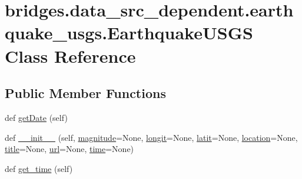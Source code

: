 \hypertarget{classbridges_1_1data__src__dependent_1_1earthquake__usgs_1_1_earthquake_u_s_g_s}{}\section{bridges.\+data\+\_\+src\+\_\+dependent.\+earthquake\+\_\+usgs.\+Earthquake\+U\+S\+GS Class Reference}
\label{classbridges_1_1data__src__dependent_1_1earthquake__usgs_1_1_earthquake_u_s_g_s}
\subsection*{Public Member Functions}
\begin{DoxyCompactItemize}
\item 
def \mbox{\hyperlink{classbridges_1_1data__src__dependent_1_1earthquake__usgs_1_1_earthquake_u_s_g_s_adf6fe69d97efe47958316b2ebb6bd6fe}{get\+Date}} (self)
\item 
def \mbox{\hyperlink{classbridges_1_1data__src__dependent_1_1earthquake__usgs_1_1_earthquake_u_s_g_s_abddcbcfdc6985d7b95f3ce780b53b344}{\+\_\+\+\_\+init\+\_\+\+\_\+}} (self, \mbox{\hyperlink{classbridges_1_1data__src__dependent_1_1earthquake__usgs_1_1_earthquake_u_s_g_s_a5930830a73d46dad63488314add097ab}{magnitude}}=None, \mbox{\hyperlink{classbridges_1_1data__src__dependent_1_1earthquake__usgs_1_1_earthquake_u_s_g_s_a62ad0ea0ed4be4cbd325d4ca98144f09}{longit}}=None, \mbox{\hyperlink{classbridges_1_1data__src__dependent_1_1earthquake__usgs_1_1_earthquake_u_s_g_s_aced17bcf9683a5c3c152b9490a6323b9}{latit}}=None, \mbox{\hyperlink{classbridges_1_1data__src__dependent_1_1earthquake__usgs_1_1_earthquake_u_s_g_s_a006ef7c3690b1ea0ec391fc156bc8fc5}{location}}=None, \mbox{\hyperlink{classbridges_1_1data__src__dependent_1_1earthquake__usgs_1_1_earthquake_u_s_g_s_a85fb9d3a099632dcbc83701e092a9fa7}{title}}=None, \mbox{\hyperlink{classbridges_1_1data__src__dependent_1_1earthquake__usgs_1_1_earthquake_u_s_g_s_a78ead396d25a2c7af8edf0b38650d9ea}{url}}=None, \mbox{\hyperlink{classbridges_1_1data__src__dependent_1_1earthquake__usgs_1_1_earthquake_u_s_g_s_aacc317fa18e83353df6c8ffb3d47d6c1}{time}}=None)
\item 
def \mbox{\hyperlink{classbridges_1_1data__src__dependent_1_1earthquake__usgs_1_1_earthquake_u_s_g_s_acd92c604dbee8adcdc332597c59fd0b9}{get\+\_\+time}} (self)
\item 

\end{DoxyCompactItemize}
